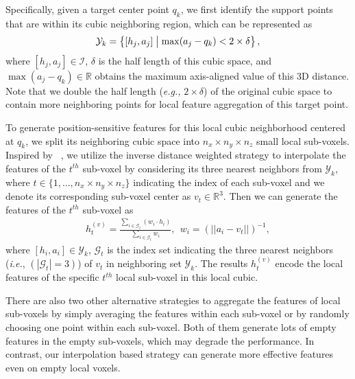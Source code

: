 \documentclass[natbib,twocolumn]{svjour3}          \smartqed  \usepackage{graphicx}
\begin{document}
Specifically, given a target center point $q_k$, we first identify the support points that are within its cubic neighboring region, which can be represented as  
\begin{align}
	\mathcal{Y}_k =\left\lbrace \left[h_j, a_j\right] \;\middle|\;
	\begin{tabular}{@{}l@{}}
		$\max (a_j - q_k) < 2\times \delta$\\
	\end{tabular}
	\right\rbrace,
\end{align}
where $[h_j, a_j] \in \mathcal{I}$, $\delta$ is the half length of this cubic space, and $\max(a_j-q_k) \in \mathbb{R}$ obtains the maximum axis-aligned value of this 3D distance. 
Note that we double the half length (\emph{e.g.,} $2\times \delta$) of the original cubic space to contain more neighboring points for local feature aggregation of this target point. 

To generate position-sensitive features for this local cubic neighborhood centered at $q_k$, we split its neighboring cubic space 
into $n_x\times n_y\times n_z$ small local sub-voxels.
Inspired by ~\citep{qi2017pointnet++}, 
we utilize the inverse distance weighted strategy to interpolate the features of the $t^{th}$ sub-voxel by considering its three nearest neighbors from $\mathcal{Y}_k$, where $t\in \{1, \dots, n_x\times n_y\times n_z\}$ indicating the index of each sub-voxel and we denote its corresponding sub-voxel center as $v_t\in \mathbb{R}^3$. 
Then we can generate the features of the $t^{th}$ sub-voxel as 
\begin{align}
	h^{(v)}_t=\frac{\sum_{i\in \mathcal{G}_t}\left( w_i\cdot h_i\right)}{\sum_{i\in \mathcal{G}_t} w_i}, 
	~~w_{i}=(||a_{i} - v_t||)^{-1}, 
\end{align} 
where $\left[h_i, a_{i}\right] \in \mathcal{Y}_k$, $\mathcal{G}_t$ is the index set indicating the three nearest neighbors (\emph{i.e.}, $(|\mathcal{G}_t|=3)$) of $v_t$ in neighboring set $\mathcal{Y}_k$.
The results $h^{(v)}_t$ encode the local features of the specific $t^{th}$ local sub-voxel in this local cubic.

There are also two other alternative strategies to aggregate the features of local sub-voxels by simply averaging the features within each sub-voxel or by randomly choosing one point within each sub-voxel. Both of them generate lots of empty features in the empty sub-voxels, which may degrade the performance. In contrast, our interpolation based strategy can generate more effective features even on empty local voxels. 
\end{document}
